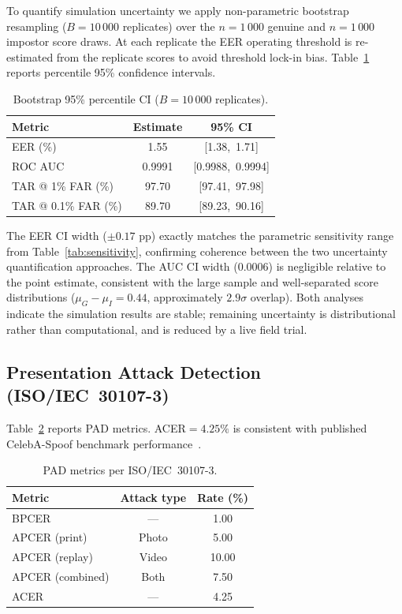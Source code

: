 \documentclass[pdflatex,sn-vancouver-num]{sn-jnl}%
\theoremstyle{thmstyleone}%
\theoremstyle{thmstyletwo}%
\theoremstyle{thmstylethree}%
\begin{document}
To quantify simulation uncertainty we apply non-parametric bootstrap resampling
(\(B{=}10\,000\) replicates) over the \(n{=}1\,000\) genuine and
\(n{=}1\,000\) impostor score draws. At each replicate the EER operating
threshold is re-estimated from the replicate scores to avoid threshold lock-in
bias. Table~\ref{tab:bootstrap_ci} reports percentile 95\% confidence intervals.

\begin{table}[t]
\caption{Bootstrap 95\% percentile CI (\(B{=}10\,000\) replicates).}
\label{tab:bootstrap_ci}%
\begin{tabular}{|l|c|c|}
  \hline
  Metric & Estimate & 95\% CI \\
  \hline
  EER (\%)            & 1.55   & [1.38,\ 1.71] \\
  ROC AUC             & 0.9991 & [0.9988,\ 0.9994] \\
  TAR @ 1\% FAR (\%)  & 97.70  & [97.41,\ 97.98] \\
  TAR @ 0.1\% FAR (\%)& 89.70  & [89.23,\ 90.16] \\
  \hline
\end{tabular}
\end{table}

The EER CI width (\(\pm 0.17\) pp) exactly matches the parametric sensitivity
range from Table~\ref{tab:sensitivity}, confirming coherence between the two
uncertainty quantification approaches. The AUC CI width (0.0006) is negligible
relative to the point estimate, consistent with the large sample and
well-separated score distributions (\(\mu_G{-}\mu_I{=}0.44\), approximately
\(2.9\sigma\) overlap). Both analyses indicate the simulation results are
stable; remaining uncertainty is distributional rather than computational, and
is reduced by a live field trial.

\subsection{Presentation Attack Detection (ISO/IEC~30107-3)}

Table~\ref{tab:pad} reports PAD metrics. ACER\(=4.25\%\) is consistent with
published CelebA-Spoof benchmark performance~\cite{zhang2020minifasnet}.

\begin{table}[t]
\caption{PAD metrics per ISO/IEC~30107-3.}
\label{tab:pad}%
\begin{tabular}{|l|c|c|}
  \hline
  Metric & Attack type & Rate (\%) \\
  \hline
  BPCER & ---    & 1.00 \\
  APCER (print)    & Photo & 5.00 \\
  APCER (replay)   & Video & 10.00 \\
  APCER (combined) & Both  & 7.50 \\
  ACER  & ---    & 4.25 \\
  \hline
\end{tabular}
\end{table}
\end{document}

